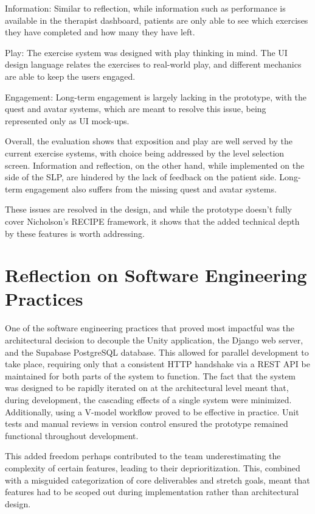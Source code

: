 Information: Similar to reflection, while information such as performance is available in the therapist dashboard, patients are only able to see which exercises they have completed and how many they have left.

Play: The exercise system was designed with play thinking in mind. The UI design language relates the exercises to real-world play, and different mechanics are able to keep the users engaged.

Engagement: Long-term engagement is largely lacking in the prototype, with the quest and avatar systems, which are meant to resolve this issue, being represented only as UI mock-ups.

Overall, the evaluation shows that exposition and play are well served by the current exercise systems, with choice being addressed by the level selection screen. Information and reflection, on the other hand, while implemented on the side of the SLP, are hindered by the lack of feedback on the patient side. Long-term engagement also suffers from the missing quest and avatar systems. 

These issues are resolved in the design, and while the prototype doesn't fully cover Nicholson's RECIPE framework, it shows that the added technical depth by these features is worth addressing.

\section{Reflection on Software Engineering Practices}
\label{sec:reflection-on-software-engineering-practices}

One of the software engineering practices that proved most impactful was the architectural decision to decouple the Unity application, the Django web server, and the Supabase PostgreSQL database. This allowed for parallel development to take place, requiring only that a consistent HTTP handshake via a REST API be maintained for both parts of the system to function. The fact that the system was designed to be rapidly iterated on at the architectural level meant that, during development, the cascading effects of a single system were minimized. Additionally, using a V-model workflow proved to be effective in practice. Unit tests and manual reviews in version control ensured the prototype remained functional throughout development.

This added freedom perhaps contributed to the team underestimating the complexity of certain features, leading to their deprioritization. This, combined with a misguided categorization of core deliverables and stretch goals, meant that features had to be scoped out during implementation rather than architectural design.

